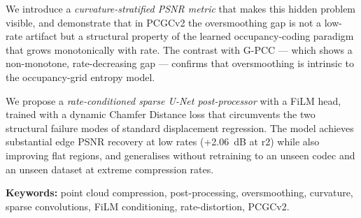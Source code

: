 We introduce a \emph{curvature-stratified PSNR metric} that makes this hidden
problem visible, and demonstrate that in PCGCv2 the oversmoothing gap is not
a low-rate artifact but a structural property of the learned occupancy-coding
paradigm that grows monotonically with rate.
The contrast with G-PCC --- which shows a non-monotone, rate-decreasing gap ---
confirms that oversmoothing is intrinsic to the occupancy-grid entropy model.

We propose a \emph{rate-conditioned sparse U-Net post-processor} with a FiLM
head, trained with a dynamic Chamfer Distance loss that circumvents the two
structural failure modes of standard displacement regression.
The model achieves substantial edge PSNR recovery at low rates (+2.06~dB at r2)
while also improving flat regions, and generalises without retraining to an
unseen codec and an unseen dataset at extreme compression rates.

\vspace{1em}
\noindent\textbf{Keywords:}
point cloud compression, post-processing, oversmoothing, curvature,
sparse convolutions, FiLM conditioning, rate-distortion, PCGCv2.
